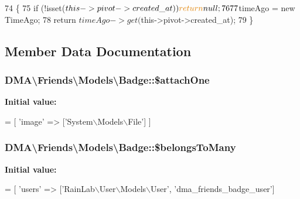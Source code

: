 \begin{DoxyCode}
74     \{
75         \textcolor{keywordflow}{if} (!isset($this->pivot->created\_at)) \textcolor{keywordflow}{return} null;
76 
77         $timeAgo = \textcolor{keyword}{new} TimeAgo;
78         \textcolor{keywordflow}{return} $timeAgo->get($this->pivot->created\_at);
79     \}
\end{DoxyCode}


\subsection{Member Data Documentation}
\hypertarget{classDMA_1_1Friends_1_1Models_1_1Badge_abd4795b249f74dd23651f51479fbe5fb}{
\subsubsection[{\$attach\+One}]{\setlength{\rightskip}{0pt plus 5cm}D\+M\+A\textbackslash{}\+Friends\textbackslash{}\+Models\textbackslash{}\+Badge\+::\$attach\+One}}\label{classDMA_1_1Friends_1_1Models_1_1Badge_abd4795b249f74dd23651f51479fbe5fb}
{\bfseries Initial value\+:}
\begin{DoxyCode}
= [
        \textcolor{stringliteral}{'image'} => [\textcolor{stringliteral}{'System\(\backslash\)Models\(\backslash\)File'}]
    ]
\end{DoxyCode}
\hypertarget{classDMA_1_1Friends_1_1Models_1_1Badge_ab143958e8f63d5b612832fee145f0aa1}{
\subsubsection[{\$belongs\+To\+Many}]{\setlength{\rightskip}{0pt plus 5cm}D\+M\+A\textbackslash{}\+Friends\textbackslash{}\+Models\textbackslash{}\+Badge\+::\$belongs\+To\+Many}}\label{classDMA_1_1Friends_1_1Models_1_1Badge_ab143958e8f63d5b612832fee145f0aa1}
{\bfseries Initial value\+:}
\begin{DoxyCode}
= [
        \textcolor{stringliteral}{'users'} => [\textcolor{stringliteral}{'RainLab\(\backslash\)User\(\backslash\)Models\(\backslash\)User'}, \textcolor{stringliteral}{'dma\_friends\_badge\_user'}]
\end{DoxyCode}
